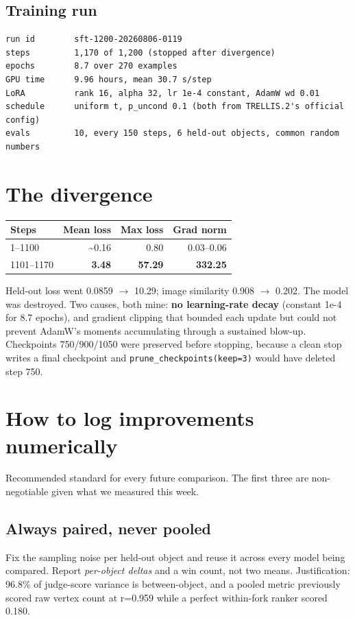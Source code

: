 \documentclass[11pt,a4paper]{article}
\newcommand{\bad}[1]{\textcolor{bad}{\textbf{#1}}}
\begin{document}
\subsection{Training run}
\begin{Verbatim}[fontsize=\small,frame=leftline,framerule=1pt,xleftmargin=8pt]
run id        sft-1200-20260806-0119
steps         1,170 of 1,200 (stopped after divergence)
epochs        8.7 over 270 examples
GPU time      9.96 hours, mean 30.7 s/step
LoRA          rank 16, alpha 32, lr 1e-4 constant, AdamW wd 0.01
schedule      uniform t, p_uncond 0.1 (both from TRELLIS.2's official config)
evals         10, every 150 steps, 6 held-out objects, common random numbers
\end{Verbatim}
\section{The divergence}
\begin{center}\small
\begin{tabular}{@{}lrrr@{}}
\toprule
\textbf{Steps} & \textbf{Mean loss} & \textbf{Max loss} & \textbf{Grad norm} \\
\midrule
1--1100 & \textasciitilde{}0.16 & 0.80 & 0.03--0.06 \\
1101--1170 & \bad{3.48} & \bad{57.29} & \bad{332.25} \\
\bottomrule
\end{tabular}
\end{center}
Held-out loss went 0.0859 $\rightarrow$ 10.29; image similarity 0.908 $\rightarrow$ 0.202. The model was destroyed.
Two causes, both mine: \textbf{no learning-rate decay} (constant 1e-4 for 8.7 epochs), and gradient
clipping that bounded each update but could not prevent AdamW's moments accumulating through a
sustained blow-up. Checkpoints 750/900/1050 were preserved before stopping, because a clean stop
writes a final checkpoint and \texttt{prune\_checkpoints(keep=3)} would have deleted step 750.

\section{How to log improvements numerically}
Recommended standard for every future comparison. The first three are non-negotiable given what we
measured this week.

\subsection{Always paired, never pooled}
Fix the sampling noise per held-out object and reuse it across every model being compared. Report
\textit{per-object deltas} and a win count, not two means. Justification: 96.8\% of judge-score variance
is between-object, and a pooled metric previously scored raw vertex count at r=0.959 while a perfect
within-fork ranker scored 0.180.
\end{document}
